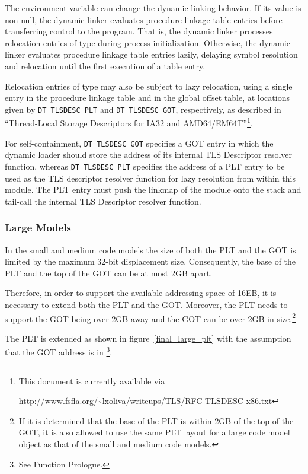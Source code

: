 The  environment variable can change the dynamic
linking behavior.  If its value is non-null, the dynamic linker
evaluates procedure linkage table entries before transferring control
to the program.  That is, the dynamic linker processes relocation
entries of type 
during process initialization.  Otherwise, the dynamic linker
evaluates procedure linkage table entries lazily, delaying symbol
resolution and relocation until the first execution of a table entry.

Relocation entries of type  may also be
subject to lazy relocation, using a single entry in the procedure
linkage table and in the global offset table, at locations given by
\texttt{DT_TLSDESC_PLT} and \texttt{DT_TLSDESC_GOT}, respectively, as
described in ``Thread-Local Storage Descriptors for IA32 and
AMD64/EM64T''\footnote{This document is currently available via
  \raggedright\url{http://www.fsfla.org/~lxoliva/writeups/TLS/RFC-TLSDESC-x86.txt}}.

For self-containment, \texttt{DT_TLSDESC_GOT} specifies a GOT entry in
which the dynamic loader should store the address of its internal TLS
Descriptor resolver function, whereas \texttt{DT_TLSDESC_PLT}
specifies the address of a PLT entry to be used as the TLS descriptor
resolver function for lazy resolution from within this module.  The
PLT entry must push the linkmap of the module onto the stack and
tail-call the internal TLS Descriptor resolver function.

\subsubsection{Large Models}

In the small and medium code models the size of both the PLT and the GOT
is limited by the maximum 32-bit displacement size.
Consequently, the base of the PLT and the
top of the GOT can be at most 2GB apart.

Therefore, in order to support the available addressing space of 16EB,
it is necessary to extend both the PLT and the GOT. Moreover, the PLT
needs to support the GOT being over 2GB away and the GOT can be over
2GB in size.\footnote{If it is determined that the base of the PLT is
within 2GB of the top of the GOT, it is also allowed to use the same
PLT layout for a large code model object as that of the small and
medium code models.}

The PLT is extended as shown in figure~\ref{final_large_plt}
with the assumption that the GOT address is
in \footnote{See Function Prologue.}.

